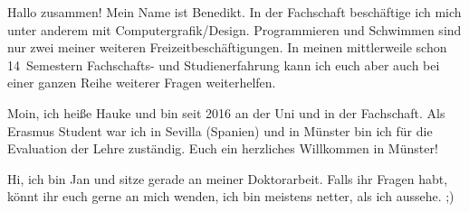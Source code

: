 \begin{multicols}{2}
{
Hallo zusammen! Mein Name ist Benedikt. In der Fachschaft beschäftige ich mich unter anderem mit Computergrafik/Design. 
Programmieren und Schwimmen sind nur zwei meiner weiteren Freizeitbeschäftigungen. 
In meinen mittlerweile schon 14~Semestern Fachschafts- und Studienerfahrung kann ich euch aber auch bei einer ganzen Reihe weiterer Fragen weiterhelfen.
}

\vspace{-0.6cm}

{
Moin, ich heiße Hauke und bin seit 2016 an der Uni und in der Fachschaft. Als Erasmus Student war ich in Sevilla (Spanien) und in Münster bin ich für die Evaluation der Lehre zuständig. 
Euch ein herzliches Willkommen in Münster!
}

\vspace{0.2cm}

{
Hi, ich bin Jan und sitze gerade an meiner Doktorarbeit. Falls ihr Fragen habt, könnt ihr euch gerne an mich wenden, ich bin meistens netter, als ich aussehe. ;)
}

\vspace{0.1cm}


\end{multicols}
